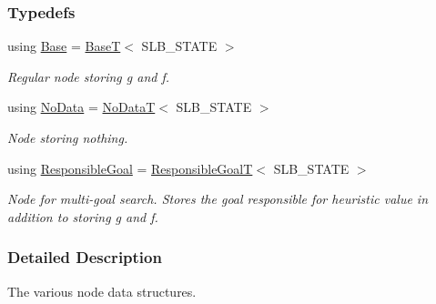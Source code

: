 \subsubsection*{Typedefs}
\begin{DoxyCompactItemize}
\item 
using \hyperlink{namespaceslb_1_1ext_1_1node_a8173225e7ba479ff34ee078e726f8465}{Base} = \hyperlink{structslb_1_1ext_1_1node_1_1BaseT}{BaseT}$<$ S\+L\+B\+\_\+\+S\+T\+A\+TE $>$\hypertarget{namespaceslb_1_1ext_1_1node_a8173225e7ba479ff34ee078e726f8465}{}\label{namespaceslb_1_1ext_1_1node_a8173225e7ba479ff34ee078e726f8465}

\begin{DoxyCompactList}\small\item\em Regular node storing {\ttfamily g} and {\ttfamily f}. \end{DoxyCompactList}\item 
using \hyperlink{namespaceslb_1_1ext_1_1node_a33def109fcb4f1a1929eca19139c7228}{No\+Data} = \hyperlink{structslb_1_1ext_1_1node_1_1NoDataT}{No\+DataT}$<$ S\+L\+B\+\_\+\+S\+T\+A\+TE $>$\hypertarget{namespaceslb_1_1ext_1_1node_a33def109fcb4f1a1929eca19139c7228}{}\label{namespaceslb_1_1ext_1_1node_a33def109fcb4f1a1929eca19139c7228}

\begin{DoxyCompactList}\small\item\em Node storing nothing. \end{DoxyCompactList}\item 
using \hyperlink{namespaceslb_1_1ext_1_1node_af03cb5c2ab34be9853737e7aa7fe6430}{Responsible\+Goal} = \hyperlink{structslb_1_1ext_1_1node_1_1ResponsibleGoalT}{Responsible\+GoalT}$<$ S\+L\+B\+\_\+\+S\+T\+A\+TE $>$\hypertarget{namespaceslb_1_1ext_1_1node_af03cb5c2ab34be9853737e7aa7fe6430}{}\label{namespaceslb_1_1ext_1_1node_af03cb5c2ab34be9853737e7aa7fe6430}

\begin{DoxyCompactList}\small\item\em Node for multi-\/goal search. Stores the goal responsible for heuristic value in addition to storing {\ttfamily g} and {\ttfamily f}. \end{DoxyCompactList}\end{DoxyCompactItemize}


\subsubsection{Detailed Description}
The various node data structures. 